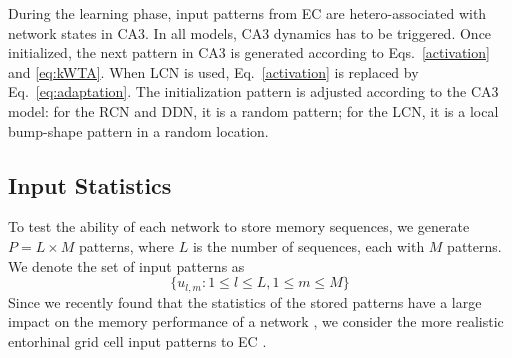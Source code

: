\documentclass[utf8]{frontiersSCNS} %
\begin{document}
During the learning phase, input patterns from EC are hetero-associated with network states in CA3. In all models, CA3 dynamics has to be triggered. Once initialized, the next pattern in CA3 is generated according to Eqs.~\ref{activation} and \ref{eq:kWTA}. When LCN is used, Eq.~\ref{activation} is replaced by Eq.~\ref{eq:adaptation}. The initialization pattern is adjusted according to the CA3 model: for the RCN and DDN, it is a random pattern; for the LCN, it is a local bump-shape pattern in a random location.


\subsection{Input Statistics}

To test the ability of each network to store memory sequences, we generate $P = L \times M$ patterns, where $L$ is the number of sequences, each with $M$ patterns. We denote the set of input patterns as 
\begin{equation}
	\{ u_{l,m}: 1\le l \le L, 1\le m \le M \}
\end{equation}
Since we recently found that the statistics of the stored patterns have a large impact on the memory performance of a network \cite{neher2015memory}, we consider the more realistic entorhinal grid cell input patterns to EC \cite{hafting2005microstructure}. 



\end{document}
